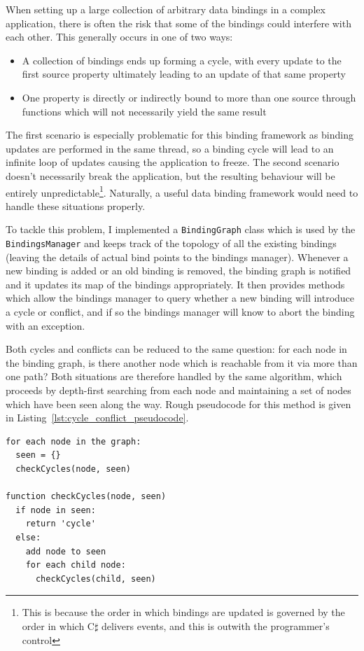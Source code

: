 \documentclass[12pt,twoside,notitlepage]{report}
\begin{document}
When setting up a large collection of arbitrary data bindings in a complex application, there is often the risk that some of the bindings could interfere with each other. This generally occurs in one of two ways:

\begin{itemize}
	\item A collection of bindings ends up forming a cycle, with every update to the first source property ultimately leading to an update of that same property
	\item One property is directly or indirectly bound to more than one source through functions which will not necessarily yield the same result
\end{itemize}

The first scenario is especially problematic for this binding framework as binding updates are performed in the same thread, so a binding cycle will lead to an infinite loop of updates causing the application to freeze. The second scenario doesn't necessarily break the application, but the resulting behaviour will be entirely unpredictable\footnote{This is because the order in which bindings are updated is governed by the order in which C$\sharp$ delivers events, and this is outwith the programmer's control}. Naturally, a useful data binding framework would need to handle these situations properly.

To tackle this problem, I implemented a \texttt{BindingGraph} class which is used by the \texttt{BindingsManager} and keeps track of the topology of all the existing bindings (leaving the details of actual bind points to the bindings manager). Whenever a new binding is added or an old binding is removed, the binding graph is notified and it updates its map of the bindings appropriately. It then provides methods which allow the bindings manager to query whether a new binding will introduce a cycle or conflict, and if so the bindings manager will know to abort the binding with an exception.

Both cycles and conflicts can be reduced to the same question: for each node in the binding graph, is there another node which is reachable from it via more than one path? Both situations are therefore handled by the same algorithm, which proceeds by depth-first searching from each node and maintaining a set of nodes which have been seen along the way. Rough pseudocode for this method is given in Listing~\ref{lst:cycle_conflict_pseudocode}.

\begin{lstlisting}[caption={Pseudocode for cycle and conflict detection}, label=lst:cycle_conflict_pseudocode]
for each node in the graph:
  seen = {}
  checkCycles(node, seen)

function checkCycles(node, seen)
  if node in seen:
    return 'cycle'
  else:
    add node to seen
    for each child node:
      checkCycles(child, seen)
\end{lstlisting}
\end{document}
